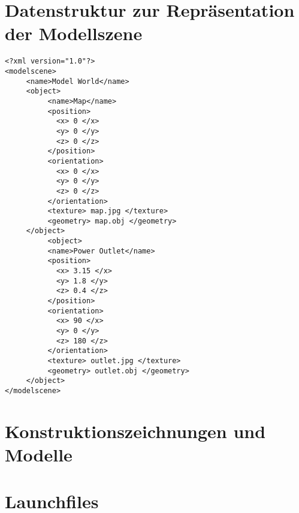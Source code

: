 \section{Datenstruktur zur Repräsentation der Modellszene}
\label{app.datastructure}
\begin{lstlisting}[label=source.data,caption=Datenstruktur zur Repräsentation der Modellszene]
<?xml version="1.0"?>
<modelscene>
     <name>Model World</name>
     <object>
          <name>Map</name>
          <position>
          	<x> 0 </x>
          	<y> 0 </y>
          	<z> 0 </z>
          </position>
          <orientation>
          	<x> 0 </x>
          	<y> 0 </y>
          	<z> 0 </z>
          </orientation>
          <texture> map.jpg </texture>
          <geometry> map.obj </geometry>
     </object>
          <object>
          <name>Power Outlet</name>
          <position>
          	<x> 3.15 </x>
          	<y> 1.8 </y>
          	<z> 0.4 </z>
          </position>
          <orientation>
          	<x> 90 </x>
          	<y> 0 </y>
          	<z> 180 </z>
          </orientation>
          <texture> outlet.jpg </texture>
          <geometry> outlet.obj </geometry>
     </object>
</modelscene>
\end{lstlisting}

\clearpage{}

%

\section{Konstruktionszeichnungen und Modelle}
\label{app:construction}

\clearpage{}

\section{Launchfiles}
\label{app:launchfiles}